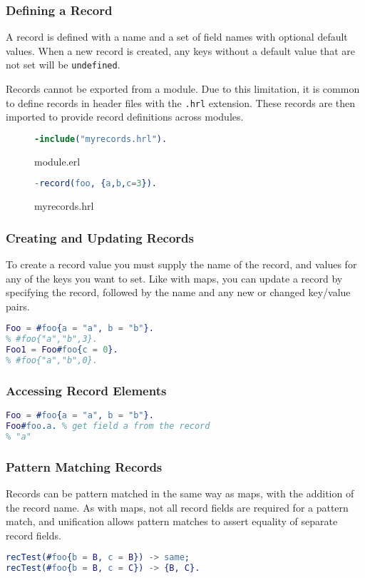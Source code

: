 \documentclass{beamer}
\begin{document}
\begin{frame}[fragile]
  \frametitle{Defining a Record}
  A record is defined with a name and a set of field names with
  optional default values.  When a new record is created, any keys
  without a default value that are not set will be {\tt undefined}.

  Records cannot be exported from a module.  Due to this limitation,
  it is common to define records in header files with the {\tt .hrl}
  extension.  These records are then imported to provide record
  definitions across modules.

\begin{figure}
\begin{lstlisting}[language=erlang]
-include("myrecords.hrl").
\end{lstlisting}
  \caption{module.erl}
\end{figure}

\begin{figure}
\begin{lstlisting}[language=erlang]
-record(foo, {a,b,c=3}).
\end{lstlisting}
  \caption{myrecords.hrl}
\end{figure}

\end{frame}

\begin{frame}[fragile]
  \frametitle{Creating and Updating Records}
  To create a record value you must supply the name of the record, and
  values for any of the keys you want to set.  Like with maps, you can
  update a record by specifying the record, followed by the name and
  any new or changed key/value pairs.
\begin{lstlisting}[language=erlang]
Foo = #foo{a = "a", b = "b"}.
% #foo{"a","b",3}.
Foo1 = Foo#foo{c = 0}.
% #foo{"a","b",0}.
\end{lstlisting}
\end{frame}

\begin{frame}[fragile]
  \frametitle{Accessing Record Elements}
\begin{lstlisting}[language=erlang]
Foo = #foo{a = "a", b = "b"}.
Foo#foo.a. % get field a from the record
% "a"
\end{lstlisting}
\end{frame}

\begin{frame}[fragile]
  \frametitle{Pattern Matching Records}
  Records can be pattern matched in the same way as maps, with the
  addition of the record name.  As with maps, not all record fields
  are required for a pattern match, and unification allows pattern
  matches to assert equality of separate record fields.
\begin{lstlisting}[language=erlang]
recTest(#foo{b = B, c = B}) -> same;
recTest(#foo{b = B, c = C}) -> {B, C}.
\end{lstlisting}
\end{frame}
\end{document}

